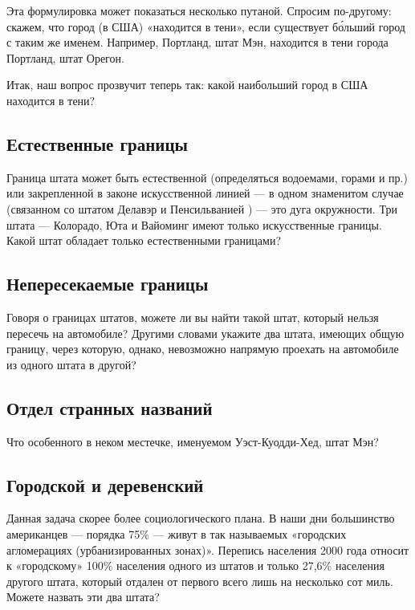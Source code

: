 \medskip

Эта формулировка может показаться несколько путаной. Спросим по-другому: скажем, что город (в США) «находится в тени», если существует б\'{о}льший город с таким же именем. Например,
Портланд, штат Мэн,  находится в тени города Портланд, штат Орегон.


Итак,  наш вопрос прозвучит теперь так: какой наибольший город в США находится в тени?




\subsection*{Естественные границы}%


Граница штата может быть естественной (определяться водоемами, горами и пр.) или 
закрепленной в законе искусственной линией --- в одном знаменитом случае (связанном со штатом Делавэр и Пенсильванией ) --- это дуга окружности. Три штата --- Колорадо, Юта и Вайоминг имеют только искусственные границы. Какой штат обладает только естественными границами?




\subsection*{Непересекаемые границы}%


Говоря о границах штатов, можете ли вы найти такой штат, который нельзя пересечь на автомобиле? Другими словами укажите два штата, имеющих общую границу, через которую, однако, невозможно  напрямую проехать на автомобиле из одного штата в другой?




\subsection*{Отдел странных названий}%


Что особенного в неком местечке, именуемом  Уэст-Куодди-Хед, %
штат Мэн?




\subsection*{Городской и деревенский}%


Данная задача скорее более социологического плана. 
В наши дни большинство американцев --- порядка 75\% --- живут в так называемых «городских агломерациях (урбанизированных зонах)». 
Перепись населения 2000 года относит к «городскому» 100\% населения одного из штатов и только 27,6\% населения другого штата, который отдален от первого всего лишь на несколько сот миль.  
Можете назвать эти два штата?




